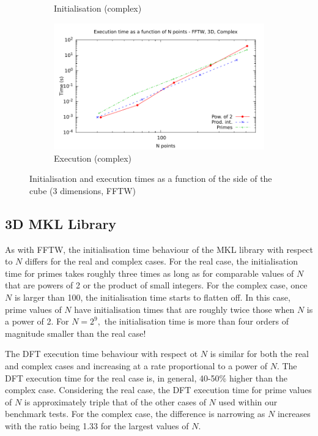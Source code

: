 \documentclass[12pt, a4paper]{article} \setlength{\textheight}{24cm}
\begin{document}
\begin{figure}[H]
\begin{subfigure}{.5\textwidth}
    \caption{Initialisation (complex)}
    \label{3DFFTWCI}
  \end{subfigure}%
  \begin{subfigure}{.5\textwidth}
    \centering
    \includegraphics[width=.9\linewidth]{graphs/3d-fftw-exec-c.pdf}
    \caption{Execution (complex)}
    \label{3DFFTWC}
  \end{subfigure}
  \caption{Initialisation and execution times as a function of the
    side of the cube (3 dimensions, FFTW)}
  \label{3DFFTW}
\end{figure}


\subsection{3D MKL Library}
As with FFTW, the initialisation time behaviour of the MKL library
with respect to $N$ differs for the real and complex cases. For the
real case, the initialisation time for primes takes roughly three
times as long as for comparable values of $N$ that are powers of 2 or
the product of small integers. For the complex case, once $N$ is
larger than 100, the initialisation time starts to flatten off. In
this case, prime values of $N$ have initialisation times that are
roughly twice those when $N$ is a power of 2. For $N=2^9,$ the
initialisation time is more than four orders of magnitude smaller than
the real case!

The DFT execution time behaviour with respect ot $N$ is similar for
both the real and complex cases and increasing at a rate proportional
to a power of $N.$ The DFT execution time for the real case is, in
general, 40-50\% higher than the complex case. Considering the real
case, the DFT execution time for prime values of $N$ is approximately
triple that of the other cases of $N$ used within our benchmark
tests. For the complex case, the difference is narrowing as $N$
increases with the ratio being 1.33 for the largest values of $N.$
\end{document}
